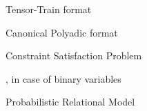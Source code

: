 %
%



\begin{description}[CABR]
    \item [TT] Tensor-Train format
    \item [CP] Canonical Polyadic format
    \item [CSP] Constraint Satisfaction Problem
    \item [CAN] \ComputationActivationNetwork{}
    \item [HLN] \HybridLogicNetwork{}, \ComputationActivationNetwork{} in case of binary variables
    \item [PRM] Probabilistic Relational Model
\end{description}